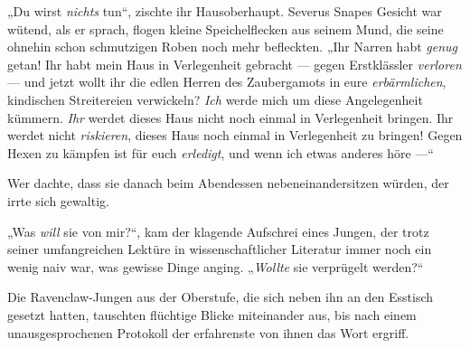 „Du wirst \emph{nichts} tun“, zischte ihr Hausoberhaupt. Severus Snapes Gesicht war wütend, als er sprach, flogen kleine Speichelflecken aus seinem Mund, die seine ohnehin schon schmutzigen Roben noch mehr befleckten.
„Ihr Narren habt \emph{genug} getan! Ihr habt mein Haus in Verlegenheit gebracht — gegen Erstklässler \emph{verloren} — und jetzt wollt ihr die edlen Herren des Zaubergamots in eure \emph{erbärmlichen}, kindischen Streitereien verwickeln? \emph{Ich} werde mich um diese Angelegenheit kümmern. \emph{Ihr} werdet dieses Haus nicht noch einmal in Verlegenheit bringen. Ihr werdet nicht \emph{riskieren}, dieses Haus noch einmal in Verlegenheit zu bringen! Gegen Hexen zu kämpfen ist für euch \emph{erledigt}, und wenn ich etwas anderes höre —“

\later

Wer dachte, dass sie danach beim Abendessen nebeneinandersitzen würden, der irrte sich gewaltig.

„Was \emph{will} sie von mir?“, kam der klagende Aufschrei eines Jungen, der trotz seiner umfangreichen Lektüre in wissenschaftlicher Literatur immer noch ein wenig naiv war, was gewisse Dinge anging.
„\emph{Wollte} sie verprügelt werden?“

Die Ravenclaw-Jungen aus der Oberstufe, die sich neben ihn an den Esstisch gesetzt hatten, tauschten flüchtige Blicke miteinander aus, bis nach einem unausgesprochenen Protokoll der erfahrenste von ihnen das Wort ergriff.

